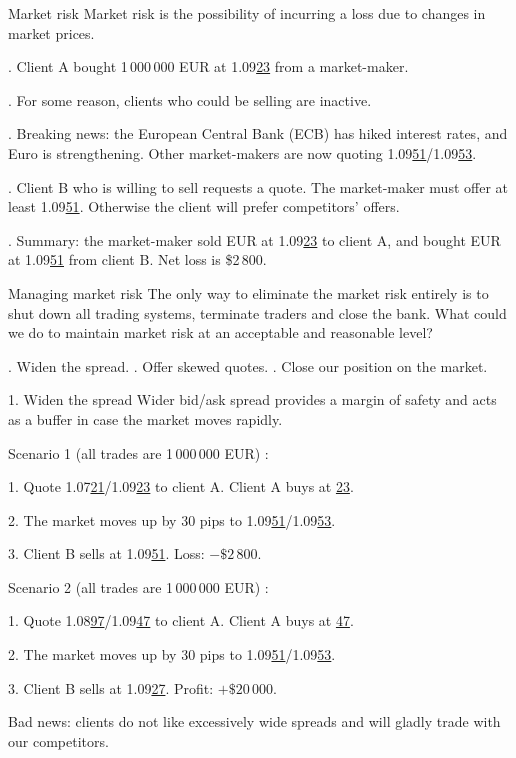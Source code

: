 \documentclass{beamer}
\begin{document}
\begin{frame}{Market risk}
\justify
\alert{Market risk} is the possibility of incurring a loss due to changes in market prices.

. Client A bought 1\,000\,000 EUR at 1.09\underline{23} from a market-maker.

. For some reason, clients who could be selling are inactive.

. Breaking news: the European Central Bank (ECB) has hiked interest rates, and Euro is strengthening. Other market-makers are now quoting 1.09\underline{51}/1.09\underline{53}.

. Client B who is willing to sell requests a quote. The market-maker must offer at least 1.09\underline{51}. Otherwise the client will prefer competitors' offers.

. Summary: the market-maker sold EUR at 1.09\underline{23} to client A, and bought EUR at 1.09\underline{51} from client B. Net loss is \$2\,800.
\end{frame}



\begin{frame}{Managing market risk}
\justify
The only way to eliminate the market risk entirely is to shut down all trading systems, terminate traders and close the bank. What could we do to maintain market risk at an acceptable and reasonable level?

. Widen the spread.
. Offer skewed quotes.
. Close our position on the market.
\end{frame}



\begin{frame}{1. Widen the spread}
\justify
Wider bid/ask spread provides a margin of safety and acts as a buffer in case the market moves
rapidly.

\justify
Scenario 1 (all trades are 1\,000\,000 EUR) :

1. Quote 1.07\underline{21}/1.09\underline{23} to client A. Client A buys at \underline{23}.

2. The market moves up by 30 pips to 1.09\underline{51}/1.09\underline{53}.

3. Client B sells at 1.09\underline{51}. Loss: $-\$2\,800$.

\justify
Scenario 2 (all trades are 1\,000\,000 EUR) :

1. Quote 1.08\underline{97}/1.09\underline{47} to client A. Client A buys at \underline{47}.

2. The market moves up by 30 pips to 1.09\underline{51}/1.09\underline{53}.

3. Client B sells at 1.09\underline{27}. Profit: $+\$20\,000$.

\justify
Bad news: clients do not like excessively wide spreads and will gladly trade with our competitors.
\end{frame}
\end{document}
